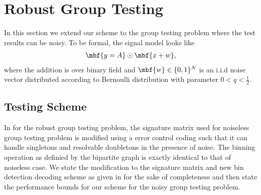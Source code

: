 \documentclass[conference,twocolumn]{IEEEtran}
\begin{document}
\section{Robust Group Testing}
In this section we extend our scheme to the group testing problem where the test results can be noisy. To be formal, the signal model looks like
\begin{align*}
\mbf{y=A}\odot \mbf{x+w},
\end{align*}
where the addition is over binary field and $\mbf{w}\in\{0,1\}^N$ is an i.i.d noise vector distributed according to Bernoulli distribution with parameter $0<q<\frac{1}{2}$.

\subsection*{Testing Scheme}
In \cite{lee2015saffron} for the robust group testing problem, the signature matrix used for noiseless group testing problem is modified using a error control coding such that it can handle singletons and resolvable doubletons in the presence of noise. The binning operation as definied by the bipartite graph is exactly identical to that of noiseless case. We state the modification to the signature matrix and new bin detection decoding scheme as given in \cite{lee2015saffron} for the sake of completeness and then state the performance bounds for our scheme for the noisy group testing problem.
\end{document}
